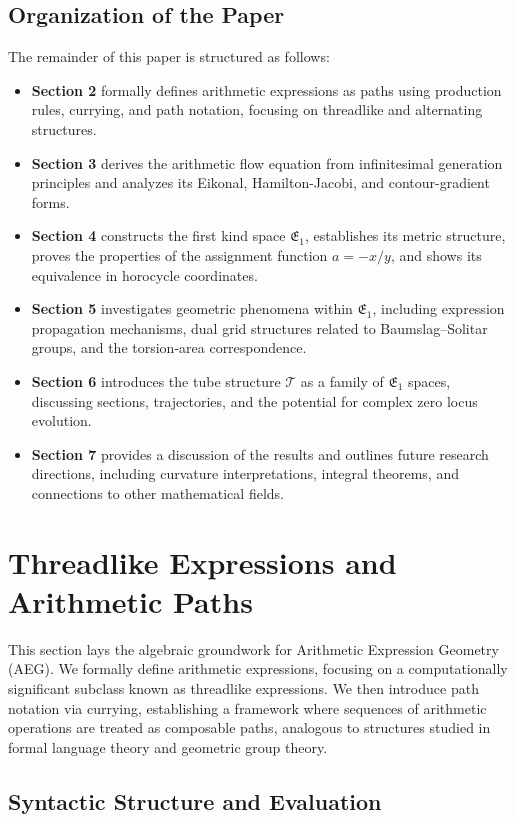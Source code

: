 \documentclass[12pt]{article}
\begin{document}
\subsection{Organization of the Paper}
The remainder of this paper is structured as follows:
\begin{itemize}
  \item \textbf{Section 2} formally defines arithmetic expressions as paths using production rules, currying, and path notation, focusing on threadlike and alternating structures.
  \item \textbf{Section 3} derives the arithmetic flow equation from infinitesimal generation principles and analyzes its Eikonal, Hamilton-Jacobi, and contour-gradient forms.
  \item \textbf{Section 4} constructs the first kind space \( \mathfrak{E}_1 \), establishes its metric structure, proves the properties of the assignment function \(a=-x/y\), and shows its equivalence in horocycle coordinates.
  \item \textbf{Section 5} investigates geometric phenomena within \( \mathfrak{E}_1 \), including expression propagation mechanisms, dual grid structures related to Baumslag–Solitar groups, and the torsion-area correspondence.
  \item \textbf{Section 6} introduces the tube structure \( \mathcal{T} \) as a family of \( \mathfrak{E}_1 \) spaces, discussing sections, trajectories, and the potential for complex zero locus evolution.
  \item \textbf{Section 7} provides a discussion of the results and outlines future research directions, including curvature interpretations, integral theorems, and connections to other mathematical fields.
\end{itemize}
\section{Threadlike Expressions and Arithmetic Paths} %

This section lays the algebraic groundwork for Arithmetic Expression Geometry (AEG). We formally define arithmetic expressions, focusing on a computationally significant subclass known as threadlike expressions. We then introduce path notation via currying, establishing a framework where sequences of arithmetic operations are treated as composable paths, analogous to structures studied in formal language theory and geometric group theory.

\subsection{Syntactic Structure and Evaluation} %
\end{document}
